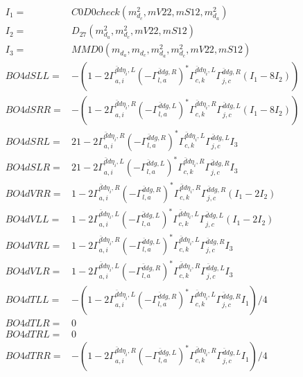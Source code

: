 \documentclass[A4,landscape]{article}
\begin{document}
\begin{align} 
I_1 = & C0D0check(m^2_{d_{{c}}}, mV22, mS12, m^2_{d_{{a}}}) \\ 
I_2 = & D_{27}(m^2_{d_{{a}}}, m^2_{d_{{c}}}, mV22, mS12) \\ 
I_3 = & MMD0(m_{d_{{a}}}, m_{d_{{c}}}, m^2_{d_{{a}}}, m^2_{d_{{c}}}, mV22, mS12) \\ 
  BO4dSLL= & -(1
-
2 \Gamma^{\bar{d}d \eta_i ,L}_{a, i} (- \Gamma^{\bar{d}d g ,R} _{l, a})^* \Gamma^{\bar{d}d \eta_i ,L}_{c, k} \Gamma^{\bar{d}d g ,R}_{j, c} (I_1 - 8 I_2)) \\ 
  BO4dSRR= & -(1
-
2 \Gamma^{\bar{d}d \eta_i ,R}_{a, i} (- \Gamma^{\bar{d}d g ,L} _{l, a})^* \Gamma^{\bar{d}d \eta_i ,R}_{c, k} \Gamma^{\bar{d}d g ,L}_{j, c} (I_1 - 8 I_2)) \\ 
  BO4dSRL= & 2 1
-
2 \Gamma^{\bar{d}d \eta_i ,R}_{a, i} (- \Gamma^{\bar{d}d g ,R} _{l, a})^* \Gamma^{\bar{d}d \eta_i ,L}_{c, k} \Gamma^{\bar{d}d g ,L}_{j, c} I_3 \\ 
  BO4dSLR= & 2 1
-
2 \Gamma^{\bar{d}d \eta_i ,L}_{a, i} (- \Gamma^{\bar{d}d g ,L} _{l, a})^* \Gamma^{\bar{d}d \eta_i ,R}_{c, k} \Gamma^{\bar{d}d g ,R}_{j, c} I_3 \\ 
  BO4dVRR= & 1
-
2 \Gamma^{\bar{d}d \eta_i ,R}_{a, i} (- \Gamma^{\bar{d}d g ,R} _{l, a})^* \Gamma^{\bar{d}d \eta_i ,R}_{c, k} \Gamma^{\bar{d}d g ,R}_{j, c} (I_1 - 2 I_2) \\ 
  BO4dVLL= & 1
-
2 \Gamma^{\bar{d}d \eta_i ,L}_{a, i} (- \Gamma^{\bar{d}d g ,L} _{l, a})^* \Gamma^{\bar{d}d \eta_i ,L}_{c, k} \Gamma^{\bar{d}d g ,L}_{j, c} (I_1 - 2 I_2) \\ 
  BO4dVRL= & 1
-
2 \Gamma^{\bar{d}d \eta_i ,R}_{a, i} (- \Gamma^{\bar{d}d g ,L} _{l, a})^* \Gamma^{\bar{d}d \eta_i ,L}_{c, k} \Gamma^{\bar{d}d g ,R}_{j, c} I_3 \\ 
  BO4dVLR= & 1
-
2 \Gamma^{\bar{d}d \eta_i ,L}_{a, i} (- \Gamma^{\bar{d}d g ,R} _{l, a})^* \Gamma^{\bar{d}d \eta_i ,R}_{c, k} \Gamma^{\bar{d}d g ,L}_{j, c} I_3 \\ 
  BO4dTLL= & -(1
-
2 \Gamma^{\bar{d}d \eta_i ,L}_{a, i} (- \Gamma^{\bar{d}d g ,R} _{l, a})^* \Gamma^{\bar{d}d \eta_i ,L}_{c, k} \Gamma^{\bar{d}d g ,R}_{j, c} I_1)/4 \\ 
  BO4dTLR= & 0 \\ 
  BO4dTRL= & 0 \\ 
  BO4dTRR= & -(1
-
2 \Gamma^{\bar{d}d \eta_i ,R}_{a, i} (- \Gamma^{\bar{d}d g ,L} _{l, a})^* \Gamma^{\bar{d}d \eta_i ,R}_{c, k} \Gamma^{\bar{d}d g ,L}_{j, c} I_1)/4 \\ 
\end{align} 
\end{document}
